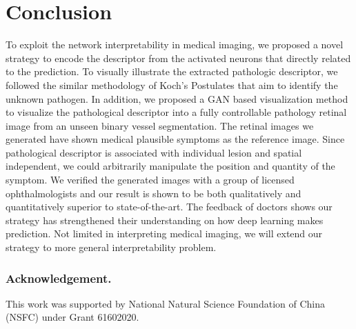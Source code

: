 \documentclass[letterpaper]{article} %
\begin{document}
	\section{Conclusion}
        To exploit the network interpretability in medical imaging, we proposed a novel strategy to encode the descriptor from the activated neurons that directly related to the prediction. To visually illustrate the extracted pathologic descriptor, we followed the similar methodology of Koch's Postulates that aim to identify the unknown pathogen. In addition, we proposed a GAN based visualization method to visualize the pathological descriptor into a fully controllable pathology retinal image from an unseen binary vessel segmentation. The retinal images we generated have shown medical plausible symptoms  as the reference image. Since pathological descriptor is associated with individual lesion and spatial independent, we could arbitrarily manipulate the position and quantity of the symptom. We verified the generated images with  a group of  licensed ophthalmologists and our result is shown to be both qualitatively and quantitatively superior to state-of-the-art. 
        The feedback of doctors shows our strategy  has strengthened their understanding on how deep learning makes prediction. Not limited in interpreting medical imaging, we will extend our strategy to more general interpretability problem.
        
        
        
        
        
        
        
        
        
        
        
        
        \subsubsection{Acknowledgement.} This work was supported by National Natural Science Foundation of China (NSFC) under Grant 61602020.
        
    
    
    
	
	
	


\end{document}
